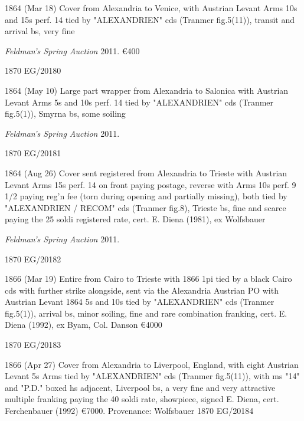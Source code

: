\documentclass[justified]{tufte-book}
\begin{document}
\def\FE{\textit{Feldman's Spring Auction} 2011. }

%
{1864 (Mar 18) Cover from Alexandria to Venice, with Austrian Levant Arms 10s and 15s perf. 14 tied by "ALEXANDRIEN" cds (Tranmer fig.5(11)), transit and arrival bs, very fine 

\FE
\euro 400
 }%
{1870}%
{EG/20180}%
{}%
{}
{}%
{}


%
{1864 (May 10) Large part wrapper from Alexandria to Salonica with Austrian Levant Arms 5s and 10s perf. 14 tied by "ALEXANDRIEN" cds (Tranmer fig.5(1)), Smyrna bs, some soiling

\FE
{}
 }%
{1870}%
{EG/20181}%
{}%
{}
{}%
{}

%
{1864 (Aug 26) Cover sent registered from Alexandria to Trieste with Austrian Levant Arms 15s perf. 14 on front paying postage, reverse with Arms 10s perf. 9 1/2 paying reg'n fee (torn during opening and partially missing), both tied by "ALEXANDRIEN / RECOM" cds (Tranmer fig.8), Trieste bs, fine and scarce paying the 25 soldi registered rate, cert. E. Diena (1981), ex Wolfsbauer

\FE 
{}
 }%
{1870}%
{EG/20182}%
{}%
{}
{}%
{}

%
{1866 (Mar 19) Entire from Cairo to Trieste with 1866 1pi tied by a black Cairo cds with further strike alongside, sent via the Alexandria Austrian PO with Austrian Levant 1864 5s and 10s tied by "ALEXANDRIEN" cds (Tranmer fig.5(1)), arrival bs, minor soiling, fine and rare combination franking, cert. E. Diena (1992), ex Byam, Col. Danson
\euro 4000

 }%
{1870}%
{EG/20183}%
{}%
{}
{}%
{}

%
{1866 (Apr 27) Cover from Alexandria to Liverpool, England, with eight Austrian Levant 5s Arms tied by "ALEXANDRIEN" cds (Tranmer fig.5(11)), with ms "14" and "P.D." boxed hs adjacent, Liverpool bs, a very fine and very attractive multiple franking paying the 40 soldi rate, showpiece, signed E. Diena, cert. Ferchenbauer (1992) \euro 7000.
Provenance: Wolfsbauer
 }%
{1870}%
{EG/20184}%
{}%
{}
{}%
{}
\end{document}
